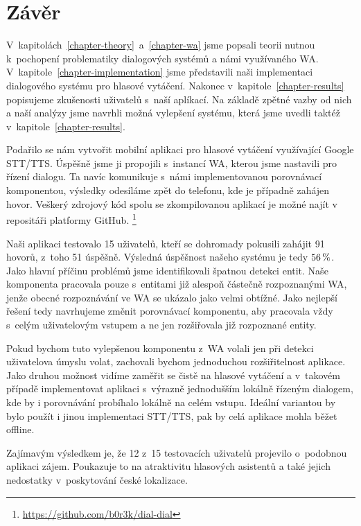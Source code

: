 \chapter*{Závěr}

V~kapitolách~\ref{chapter-theory}~a~\ref{chapter-wa} jsme popsali teorii nutnou
k~pochopení problematiky dialogových systémů a námi využívaného WA.
V~kapitole~\ref{chapter-implementation} jsme představili naši
implementaci dialogového systému pro hlasové vytáčení.
Nakonec v~kapitole~\ref{chapter-results} popisujeme zkušenosti
uživatelů s~naší aplíkací. Na základě zpětné vazby od nich a naší analýzy jsme navrhli možná
vylepšení systému, která jsme uvedli taktéž v~kapitole~\ref{chapter-results}.

Podařilo se nám vytvořit mobilní aplikaci pro hlasové vytáčení využívající
Google STT/TTS. Úspěšně jsme ji propojili
s~instancí WA, kterou jsme nastavili pro řízení dialogu. Ta navíc komunikuje s~námi
implementovanou porovnávací komponentou, výsledky odesíláme zpět do telefonu,
kde je případně zahájen hovor. Veškerý zdrojový kód spolu se zkompilovanou aplikací
je možné najít v repositáři platformy GitHub.%
\footnote{\url{https://github.com/b0r3k/dial-dial}}

Naši aplikaci testovalo 15 uživatelů, kteří se dohromady pokusili zahájit 91 hovorů,
z~toho 51 úspěšně. Výsledná úspěšnost našeho systému je tedy \(56\,\rm \%\).
Jako hlavní příčinu problémů jsme identifikovali špatnou detekci entit.
Naše komponenta pracovala pouze s~entitami již alespoň částečně rozpoznanými
WA, jenže obecné rozpoznávání ve WA se ukázalo jako velmi obtížné. Jako nejlepší
řešení tedy navrhujeme změnit porovnávací komponentu, aby pracovala vždy s~celým
uživatelovým vstupem a ne jen rozšiřovala již rozpoznané entity.

Pokud bychom tuto vylepšenou komponentu z~WA volali jen při detekci uživatelova
úmyslu volat, zachovali bychom jednoduchou rozšiřitelnost aplikace. Jako
druhou možnost vidíme zaměřit se čistě na hlasové vytáčení a v~takovém
případě implementovat aplikaci s~výrazně jednodušším lokálně řízeným
dialogem, kde by i porovnávání probíhalo lokálně na celém vstupu. Ideální
variantou by bylo použít i jinou implementaci STT/TTS, pak by
celá aplikace mohla běžet offline.

Zajímavým výsledkem je, že 12 z~15 testovacích uživatelů projevilo o~podobnou
aplikaci zájem. Poukazuje to na atraktivitu hlasových asistentů
a také jejich nedostatky v~poskytování české lokalizace.